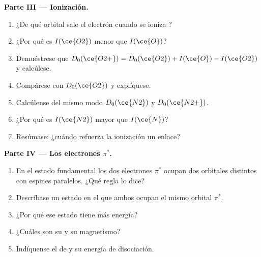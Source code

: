 \begin{problem}
\medskip
\noindent\textbf{Parte III --- Ionización.}
\begin{enumerate}[resume]
  \item ¿De qué orbital sale el electrón cuando se ioniza ?
  \item ¿Por qué es $I(\ce{O2})$ menor que $I(\ce{O})$?
  \item Demuéstrese que $D_0(\ce{O2+}) = D_0(\ce{O2}) + I(\ce{O}) - I(\ce{O2})$ y calcúlese.
  \item Compárese con $D_0(\ce{O2})$ y explíquese.
  \item Calcúlense del mismo modo $D_0(\ce{N2})$ y $D_0(\ce{N2+})$.
  \item ¿Por qué es $I(\ce{N2})$ mayor que $I(\ce{N})$?
  \item Resúmase: ¿cuándo refuerza la ionización un enlace?
\end{enumerate}

\medskip
\noindent\textbf{Parte IV --- Los electrones $\pi^*$.}
\begin{enumerate}[resume]
  \item En el estado fundamental los dos electrones $\pi^*$ ocupan dos orbitales distintos con
        espines paralelos. ¿Qué regla lo dice?
  \item Descríbase un estado en el que ambos ocupan el mismo orbital $\pi^*$.
  \item ¿Por qué ese estado tiene más energía?
  \item ¿Cuáles son su  y su magnetismo?
  \item Indíquense el  de  y su energía de disociación.
\end{enumerate}
\end{problem}
